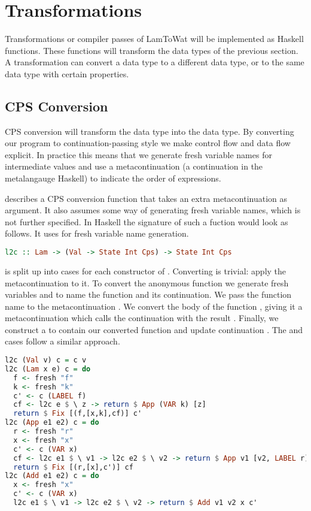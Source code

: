 {\section{\label{section:transforms}Transformations}
Transformations or compiler passes of LamToWat will be implemented as Haskell functions. These functions will transform the data types of the previous section. A transformation can convert a data type to a different data type, or to the same data type with certain properties.

\subsection{\label{subsection:cpsconvert}CPS Conversion}
CPS conversion will transform the  data type into the  data type. By converting our program to continuation-passing style we make control flow and data flow explicit. In practice this means that we generate fresh variable names for intermediate values and use a metacontinuation (a continuation in the metalangauge Haskell) to indicate the order of expressions.

\citeauthor{DBLP:books/daglib/0022396} describes a CPS conversion function that takes an extra metacontinuation as argument. It also assumes some way of generating fresh variable names, which is not further specified. In Haskell the signature of such a fuction would look as follows. It uses  for fresh variable name generation.

\begin{lstlisting}[language=Haskell]
l2c :: Lam -> (Val -> State Int Cps) -> State Int Cps
\end{lstlisting}

 is split up into cases for each constructor of . Converting  is trivial: apply the metacontinuation  to it. To convert the anonymous function  we generate fresh variables  and  to name the function and its continuation. We pass the function name to the metacontinuation . We convert the body of the function , giving it a metacontinuation which calls the continuation with the result . Finally, we construct a  to contain our converted function and update continuation . The  and  cases follow a similar approach.

\begin{lstlisting}[language=Haskell]
l2c (Val v) c = c v
l2c (Lam x e) c = do
  f <- fresh "f"
  k <- fresh "k"
  c' <- c (LABEL f)
  cf <- l2c e $ \ z -> return $ App (VAR k) [z]
  return $ Fix [(f,[x,k],cf)] c'
l2c (App e1 e2) c = do
  r <- fresh "r"
  x <- fresh "x"
  c' <- c (VAR x)
  cf <- l2c e1 $ \ v1 -> l2c e2 $ \ v2 -> return $ App v1 [v2, LABEL r]
  return $ Fix [(r,[x],c')] cf
l2c (Add e1 e2) c = do
  x <- fresh "x"
  c' <- c (VAR x)
  l2c e1 $ \ v1 -> l2c e2 $ \ v2 -> return $ Add v1 v2 x c'
\end{lstlisting}

}
